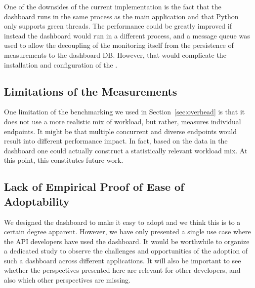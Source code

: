     One of the downsides of the current implementation is the fact that the dashboard runs in the same process as the main application and that Python only supports green threads. The performance could be greatly improved if instead the dashboard would run in a different process, %
    and a message queue was used to allow the decoupling of the monitoring itself from the persistence of measurements to the dashboard DB. 
    However, that would complicate the installation and configuration of the \tool.


  \subsection*{Limitations of the Measurements}
    One limitation of the benchmarking we used in Section~\ref{sec:overhead} is that it does not use a more realistic mix of workload, but rather, measures individual endpoints. It might be that multiple concurrent and diverse endpoints would result into different performance impact. In fact, based on the data in the dashboard one could actually construct a statistically relevant workload mix. At this point, this constitutes future work.


  \subsection*{Lack of Empirical Proof of Ease of Adoptability}

    We designed the dashboard to make it easy to adopt and we think this is to a certain degree apparent. However, we have only presented a single use case where the API developers have used the dashboard. It would be worthwhile to organize a dedicated study to observe the challenges and opportunities of the adoption of such a dashboard across different applications. It will also be important to see whether the perspectives presented here are relevant for other developers, and also which other perspectives are missing.





